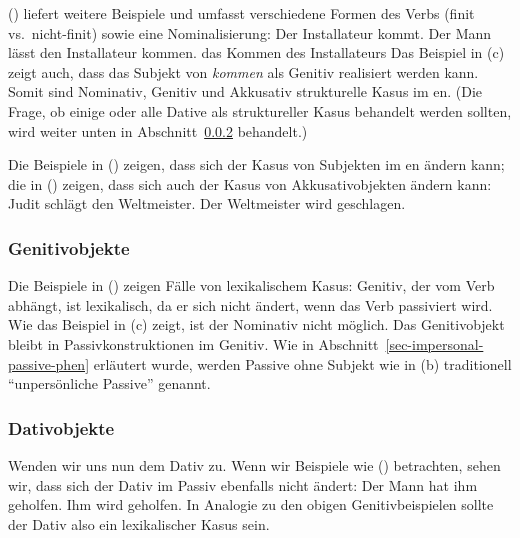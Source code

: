 () liefert weitere Beispiele und umfasst verschiedene Formen des Verbs (finit
vs.\ nicht-finit) sowie eine Nominalisierung:
\eal
\ex 
Der Installateur kommt.
\ex 
Der Mann lässt den Installateur kommen.
\ex 
das Kommen des Installateurs
\zl
Das Beispiel in (c) zeigt auch, dass das Subjekt von \emph{kommen} als
Genitiv realisiert werden kann. Somit sind Nominativ, Genitiv und Akkusativ strukturelle Kasus im en. (Die Frage,
ob einige oder alle Dative als struktureller Kasus behandelt werden sollten, wird weiter unten in Abschnitt~\ref{sec-dative-objects-tructurl-lexical} behandelt.)

Die Beispiele in () zeigen, dass sich der Kasus von Subjekten im en ändern kann; die in ()
zeigen, dass sich auch der Kasus von Akkusativobjekten ändern kann:
\eal
\ex 
Judit schlägt den Weltmeister.
\ex 
Der        Weltmeister    wird   geschlagen.
\zl

\subsubsection{Genitivobjekte}

Die Beispiele in () zeigen Fälle von lexikalischem Kasus: Genitiv, der vom Verb abhängt, ist
lexikalisch, da er sich nicht ändert, wenn das Verb passiviert wird.
\eal
{}
\zl
Wie das Beispiel in (c) zeigt, ist der Nominativ nicht möglich. Das Genitivobjekt bleibt in
Passivkonstruktionen im Genitiv. Wie in Abschnitt~\ref{sec-impersonal-passive-phen} erläutert wurde,
werden Passive ohne Subjekt wie in (b) traditionell "`unpersönliche Passive"' genannt.

\subsubsection{Dativobjekte}
\label{sec-dative-objects-tructurl-lexical}

Wenden wir uns nun dem Dativ zu. Wenn wir Beispiele wie () betrachten, sehen wir, dass sich der Dativ
im Passiv ebenfalls nicht ändert:
\eal
\ex 
Der Mann hat ihm geholfen.
\ex 
Ihm        wird geholfen.
\zl
In Analogie zu den obigen Genitivbeispielen sollte der Dativ also ein lexikalischer Kasus sein.

